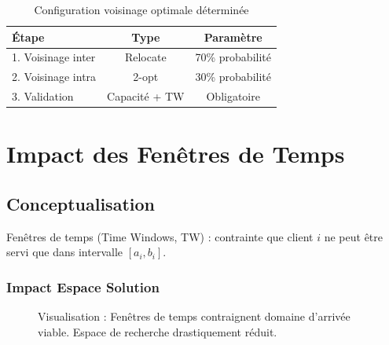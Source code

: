 \documentclass[12pt,a4paper,twoside]{report}
\begin{document}
\begin{table}[H]
    \centering
    \caption{Configuration voisinage optimale déterminée}
    \begin{tabular}{|l|c|c|}
        \hline
        \textbf{Étape}     & \textbf{Type} & \textbf{Paramètre} \\
        \hline
        1. Voisinage inter & Relocate      & 70\% probabilité   \\
        2. Voisinage intra & 2-opt         & 30\% probabilité   \\
        3. Validation      & Capacité + TW & Obligatoire        \\
        \hline
    \end{tabular}
\end{table}

\chapter{Impact des Fenêtres de Temps}

\section{Conceptualisation}

Fenêtres de temps (Time Windows, TW) : contrainte que client $i$ ne peut être
servi que dans intervalle $[a_i, b_i]$.

\subsection{Impact Espace Solution}

\begin{figure}[H]
    \centering
    \caption{Visualisation : Fenêtres de temps contraignent domaine d'arrivée viable. Espace de recherche drastiquement réduit.}
\end{figure}
\end{document}

